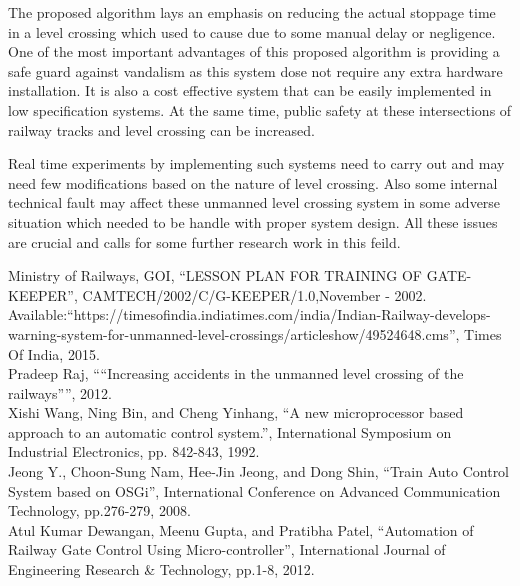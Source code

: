\documentclass{llncs}
\begin{document}
The proposed algorithm lays an emphasis on reducing the actual stoppage time in a level crossing which used to cause due to some manual delay or negligence. One of the most important advantages of this proposed algorithm is providing a safe guard against vandalism as this system dose not require any extra hardware installation. It is also a cost effective system that can be easily implemented in low specification systems. At the same time, public safety at these intersections of railway tracks and level crossing can be increased.

Real time experiments by implementing such systems need to carry out and may need few modifications based on the nature of level crossing. Also some internal technical fault may affect these unmanned level crossing system in some adverse situation which needed to be handle with proper system design. All these issues are crucial and calls for some further research work in this feild.\\ 



\begin{thebibliography}{1}

 Ministry of Railways, GOI, ``LESSON PLAN FOR TRAINING OF GATE-KEEPER'', CAMTECH/2002/C/G-KEEPER/1.0,November - 2002.\\
 Available:``https://timesofindia.indiatimes.com/india/Indian-Railway-develops-warning-system-for-unmanned-level-crossings/articleshow/49524648.cms'', Times Of India, 2015.\\
 Pradeep Raj, ``“Increasing accidents in the unmanned level crossing of the railways”'', 2012.\\
 Xishi Wang, Ning Bin, and Cheng Yinhang, ``A new microprocessor based approach to an automatic control system.'', International Symposium on Industrial Electronics, pp. 842-843, 1992.\\
 Jeong Y., Choon-Sung Nam, Hee-Jin Jeong, and Dong Shin, ``Train Auto Control System based on OSGi'', International Conference on Advanced Communication Technology, pp.276-279, 2008.\\
 Atul Kumar Dewangan, Meenu Gupta, and Pratibha Patel, ``Automation of Railway Gate Control Using Micro-controller'', International Journal of Engineering Research \& Technology, pp.1-8, 2012.\\

\end{thebibliography}
\end{document}
